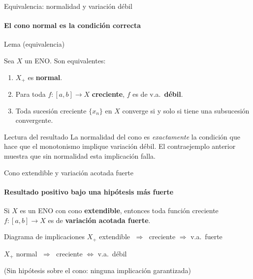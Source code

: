 \documentclass{beamer}
\newcommand{\Xp}{X_{+}}               %
\begin{document}

\begin{frame}[shrink=15]{Equivalencia: normalidad y variación débil}
\framesubtitle{El cono normal es la condición correcta}

\begin{block}{Lema (equivalencia)}
{\footnotesize Sea $X$ un ENO. Son equivalentes:
\begin{enumerate}
    \item $\Xp$ es \textbf{normal}.
    \item Para toda $f:[a,b]\to X$ \textbf{creciente}, $f$ es de v.a.\ \textbf{débil}.
    \item Toda sucesión creciente $\{x_n\}$ en $X$ converge
          si y solo si tiene una subsucesión convergente.
\end{enumerate}}
\end{block}

\begin{alertblock}{Lectura del resultado}
{\footnotesize La normalidad del cono es \emph{exactamente} la condición que hace que
el monotonismo implique variación débil.
El contraejemplo anterior muestra que sin normalidad esta implicación falla.}
\end{alertblock}


\end{frame}


\begin{frame}{Cono extendible y variación acotada fuerte}
\framesubtitle{Resultado positivo bajo una hipótesis más fuerte}

\begin{theorem}
Si $X$ es un ENO con cono \textbf{extendible}, entonces toda función
creciente $f:[a,b]\to X$ es de \textbf{variación acotada fuerte}.
\end{theorem}

\medskip

\begin{block}{Diagrama de implicaciones}
\centering
\medskip
$\Xp$ extendible
$\;\Rightarrow\;$
creciente $\Rightarrow$ v.a.\ fuerte

\medskip
$\Xp$ normal
$\;\Rightarrow\;$
creciente $\Leftrightarrow$ v.a.\ débil

\medskip
(Sin hipótesis sobre el cono: ninguna implicación garantizada)
\end{block}

\end{frame}
\end{document}
